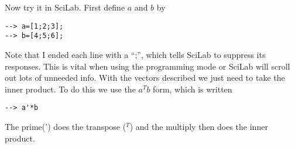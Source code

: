 
Now try it in SciLab.  First define $a$ and $b$ by
\begin{verbatim}
--> a=[1;2;3];
--> b=[4;5;6];
\end{verbatim}
Note that I ended each line with a ``;'', which tells SciLab to suppress its responses.  This is vital when using the programming mode or SciLab will scroll out lots of unneeded info.  With the vectors described we just need to take the inner product.  To do this we use the $a^Tb$ form, which is written
\begin{verbatim}
--> a'*b
\end{verbatim}
The prime(') does the transpose ($^T$) and the multiply then does the inner product.

